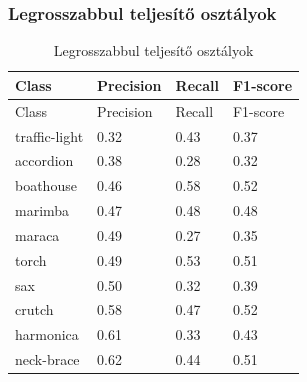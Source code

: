 \subsubsection{Legrosszabbul teljesítő osztályok}
  \begin{center}
    \begin{longtable}{llll}
    \caption{Legrosszabbul teljesítő osztályok}\label{tab:phase02_Inception-v3_legrosszabb_osztlyok}\\
    \toprule
    Class & Precision & Recall & F1-score \\
    \midrule
    \endfirsthead
    \toprule
    Class & Precision & Recall & F1-score \\
    \midrule
    \endhead
    traffic-light & 0.32 & 0.43 & 0.37 \\
    accordion & 0.38 & 0.28 & 0.32 \\
    boathouse & 0.46 & 0.58 & 0.52 \\
    marimba & 0.47 & 0.48 & 0.48 \\
    maraca & 0.49 & 0.27 & 0.35 \\
    torch & 0.49 & 0.53 & 0.51 \\
    sax & 0.50 & 0.32 & 0.39 \\
    crutch & 0.58 & 0.47 & 0.52 \\
    harmonica & 0.61 & 0.33 & 0.43 \\
    neck-brace & 0.62 & 0.44 & 0.51 \\
    \bottomrule
    \end{longtable}
  \end{center}
  